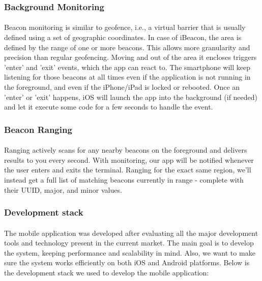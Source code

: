 \documentclass[12pt]{article}
\begin{document}
\subsubsection{Background Monitoring}
\paragraph{}Beacon monitoring is similar to geofence, i.e., a virtual barrier that is usually defined using a set of geographic coordinates. In case of iBeacon, the area is defined by the range of one or more beacons. This allows more granularity and precision than regular geofencing. Moving and out of the area it encloses triggers ’enter’ and ’exit’ events, which the app can react to. The smartphone will keep listening for those beacons at all times even if the application is not running in the foreground, and even if the iPhone/iPad is locked or rebooted. Once an ’enter’ or ’exit’ happens, iOS will launch the app into the background (if needed) and let it execute some code for a few seconds to handle the event.

\subsubsection{Beacon Ranging}
\paragraph{} Ranging actively scans for any nearby beacons on the foreground and delivers results to you every second. With monitoring, our app will be notified whenever the user enters and exits the terminal. Ranging for the exact same region, we’ll instead get a full list of matching beacons currently in range - complete with their UUID, major, and minor values.

\subsubsection{Development stack}
\paragraph{} The mobile application was developed after evaluating all the major development tools and technology present in the current market. The main goal is to develop the system, keeping performance and scalability in mind. Also, we want to make sure the system works efficiently on both iOS and Android platforms. Below is the development stack we used to develop the mobile application:
\end{document}
